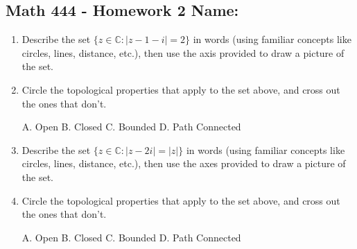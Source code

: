 \documentclass[11pt]{article}
\newcommand{\C}{\mathbb{C}}
\begin{document}
\pagestyle{empty}
\subsection*{Math 444 - Homework 2 \hfill Name: \underline{\hspace*{2in}}}
\begin{enumerate}
\item Describe the set $\{z\in \C : | z - 1 - i| = 2\}$ in words (using familiar concepts like circles, lines, distance, etc.), then use the axis provided to draw a picture of the set.
\begin{flushright}
\end{flushright}

\item Circle the topological properties that apply to the set above, and cross out the ones that don't.
\begin{center}
A. Open \hspace*{0.4in} B. Closed \hspace*{0.4in} C. Bounded \hspace*{0.4in} D. Path Connected
\end{center}
\vspace*{0.15in}

\item Describe the set $\{z \in \C : | z - 2i | = |z| \}$ in words (using familiar concepts like circles, lines, distance, etc.), then use the axes provided to draw a picture of the set.  \\
\begin{flushright}
\end{flushright}


\item Circle the topological properties that apply to the set above, and cross out the ones that don't.
\begin{center}
A. Open \hspace*{0.4in} B. Closed \hspace*{0.4in} C. Bounded \hspace*{0.4in} D. Path Connected
\end{center}
\vspace*{0.15in}



\end{enumerate}
\end{document}
